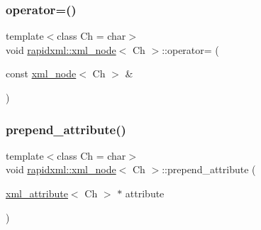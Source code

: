 \subsubsection{\texorpdfstring{operator=()}{operator=()}}
{\footnotesize\ttfamily template$<$class Ch = char$>$ \\
void \mbox{\hyperlink{classrapidxml_1_1xml__node}{rapidxml\+::xml\+\_\+node}}$<$ Ch $>$\+::operator= (\begin{DoxyParamCaption}\item[{const \mbox{\hyperlink{classrapidxml_1_1xml__node}{xml\+\_\+node}}$<$ Ch $>$ \&}]{ }\end{DoxyParamCaption})\hspace{0.3cm}{\ttfamily [private]}}

\mbox{\label{classrapidxml_1_1xml__node_a8b62ee76489faf8e2d1210869d547684}} 
\subsubsection{\texorpdfstring{prepend\_attribute()}{prepend\_attribute()}}
{\footnotesize\ttfamily template$<$class Ch = char$>$ \\
void \mbox{\hyperlink{classrapidxml_1_1xml__node}{rapidxml\+::xml\+\_\+node}}$<$ Ch $>$\+::prepend\+\_\+attribute (\begin{DoxyParamCaption}\item[{\mbox{\hyperlink{classrapidxml_1_1xml__attribute}{xml\+\_\+attribute}}$<$ Ch $>$ $\ast$}]{attribute }\end{DoxyParamCaption})\hspace{0.3cm}{\ttfamily [inline]}}

